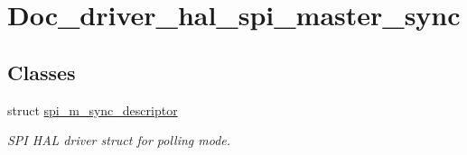 \hypertarget{group__doc__driver__hal__spi__master__sync}{}\section{Doc\+\_\+driver\+\_\+hal\+\_\+spi\+\_\+master\+\_\+sync}
\label{group__doc__driver__hal__spi__master__sync}
\subsection*{Classes}
\begin{DoxyCompactItemize}
\item 
struct \hyperlink{structspi__m__sync__descriptor}{spi\+\_\+m\+\_\+sync\+\_\+descriptor}
\begin{DoxyCompactList}\small\item\em S\+PI H\+AL driver struct for polling mode. \end{DoxyCompactList}\end{DoxyCompactItemize}
